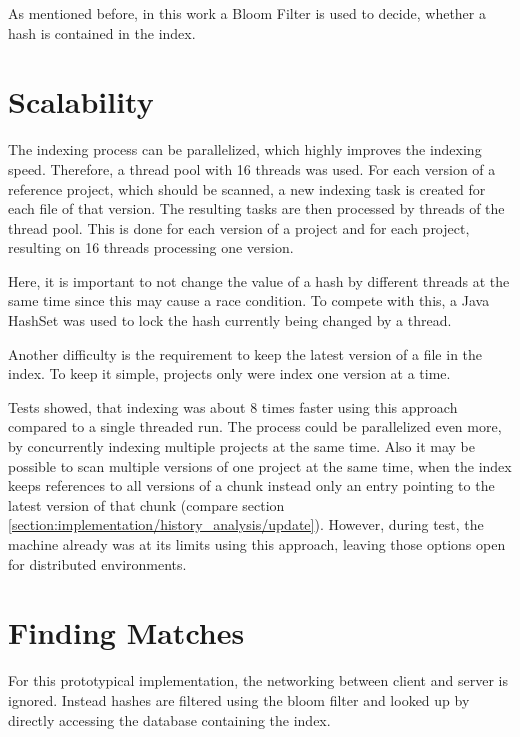 As mentioned before, in this work a Bloom Filter is used to decide, whether a hash is contained in the index.

\section{Scalability}\label{section:implementation/scalability}
The indexing process can be parallelized, which highly improves the indexing speed.
Therefore, a thread pool with 16 threads was used.
For each version of a reference project, which should be scanned, a new indexing task is created for each file of that version.
The resulting tasks are then processed by threads of the thread pool.
This is done for each version of a project and for each project, resulting on 16 threads processing one version.

Here, it is important to not change the value of a hash by different threads at the same time since this may cause a race condition.
To compete with this, a Java HashSet was used to lock the hash currently being changed by a thread.

Another difficulty is the requirement to keep the latest version of a file in the index.
To keep it simple, projects only were index one version at a time.

Tests showed, that indexing was about 8 times faster using this approach compared to a single threaded run.
The process could be parallelized even more, by concurrently indexing multiple projects at the same time.
Also it may be possible to scan multiple versions of one project at the same time, when the index keeps  references to all versions of a chunk instead only an entry pointing to the latest version of that chunk (compare section \ref{section:implementation/history_analysis/update}).
However, during test, the machine already was at its limits using this approach, leaving those options open for distributed environments.

\section{Finding Matches}\label{section:implementation/finding_matches}
For this prototypical implementation, the networking between client and server is ignored.
Instead hashes are filtered using the bloom filter and looked up by directly accessing the database containing the index.

